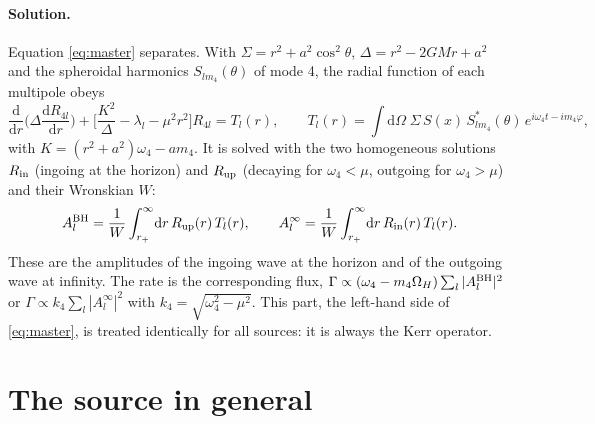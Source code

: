 \documentclass[11pt]{article}
\newcommand{\dd}{\mathrm{d}}
\begin{document}
\paragraph{Solution.} Equation \eqref{eq:master} separates. With $\Sigma=r^2+a^2\cos^2\theta$, $\Delta=r^2-2GMr+a^2$ and the spheroidal harmonics
$S_{l m_4}(\theta)$ of mode 4, the radial function of each multipole obeys
\begin{equation}
\frac{\dd}{\dd r}\!\Big(\Delta\frac{\dd R_{4l}}{\dd r}\Big)+\Big[\frac{K^2}{\Delta}-\lambda_l-\mu^2r^2\Big]R_{4l}=T_l(r),\qquad
T_l(r)=\int\!\dd\Omega\;\Sigma\,S(x)\,S^*_{lm_4}(\theta)\,e^{i\omega_4t-im_4\varphi},
\end{equation}
with $K=(r^2+a^2)\omega_4-am_4$. It is solved with the two homogeneous solutions $R_{\rm in}$ (ingoing at the horizon) and
$R_{\rm up}$ (decaying for $\omega_4<\mu$, outgoing for $\omega_4>\mu$) and their Wronskian $W$:
\begin{equation}
A^{\rm BH}_l=\frac1W\int_{r_+}^{\infty}\!\dd r\,R_{\rm up}(r)\,T_l(r),\qquad
A^{\infty}_l=\frac1W\int_{r_+}^{\infty}\!\dd r\,R_{\rm in}(r)\,T_l(r).
\end{equation}
These are the amplitudes of the ingoing wave at the horizon and of the outgoing wave at infinity. The rate is the corresponding flux,
$\Gamma\propto(\omega_4-m_4\Omega_H)\sum_l|A_l^{\rm BH}|^2$ or $\Gamma\propto k_4\sum_l|A_l^\infty|^2$ with $k_4=\sqrt{\omega_4^2-\mu^2}$.
This part, the left-hand side of \eqref{eq:master}, is treated identically for all sources: it is always the Kerr operator.

\section{The source in general}
\end{document}
